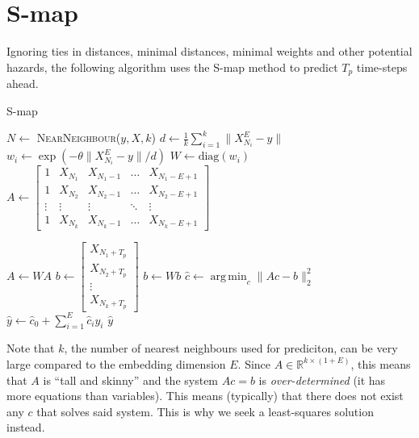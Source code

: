 \documentclass{article}
\theoremstyle{definition}
\newcommand{\R}{\mathbb{R}}
\newcommand{\diag}{\text{diag}}
\DeclareMathOperator*{\argmin}{arg\,min}
\begin{document}
\section{S-map}
Ignoring ties in distances, minimal distances, minimal weights and
other potential hazards, the following algorithm uses the S-map method
to predict $T_p$ time-steps ahead.
%
\begin{algorithm}
  \caption{S-map \cite{Sugihara94}}\label{alg:smap}
  \begin{algorithmic}[1]
    \State $N \gets$ \textsc{NearNeighbour}($y, X, k$)
    \State $d \gets \frac{1}{k} \sum_{i=1}^k \| X_{N_i}^{E} - y\|$
    \State $w_i \gets \exp (-\theta \| X_{N_i}^{E} - y\| / d )$
    \EndFor
    \State $W \gets \diag(w_i)$ 
    \State $A \gets
    \begin{bmatrix}
      1          & X_{N_1} & X_{N_1- 1} & \dots  & X_{N_1 - E + 1} \\
      1          & X_{N_2} & X_{N_2- 1} & \dots  & X_{N_2 - E + 1} \\
      \vdots     & \vdots & \vdots   & \ddots & \vdots       \\
      1          & X_{N_k} & X_{N_k- 1} & \dots  & X_{N_k - E + 1} 
    \end{bmatrix} $
    
    \State $A \gets WA$ 
    \State $b \gets 
    \begin{bmatrix}
      X_{N_1 + T_p} \\
      X_{N_2 + T_p} \\
      \vdots  \\
      X_{N_k + T_p} 
    \end{bmatrix} $
    \State $b \gets Wb$ 
    \State $\hat{c} \gets \argmin_{c} \| Ac - b \|_2^2$
    \State $\hat{y} \gets \hat{c}_0 + \sum_{i=1}^E\hat{c}_iy_i$
    \State \Return $\hat{y}$
    \EndProcedure
  \end{algorithmic}
\end{algorithm}

Note that $k$, the number of nearest neighbours used for prediciton,
can be very large compared to the embedding dimension $E$. Since $A
\in \R^{k \times (1+E)}$, this means that $A$ is ``tall and skinny''
and the system $Ac = b$ is \emph{over-determined} (it has more
equations than variables). This means (typically) that there does not
exist any $c$ that solves said system. This is why we seek a
least-squares solution instead.




\end{document}
